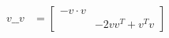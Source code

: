 \documentclass{scrartcl}
\renewcommand{\blank}{\_\_}
\begin{document}
\begin{multicols*}{2}
\begin{align*}
    v\blank v &=
    \begin{bmatrix}
      -v\cdot v &  \\
       & -2vv^T+ v^Tv
    \end{bmatrix} \\
  \end{align*}


\end{multicols*}
\end{document}
